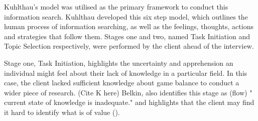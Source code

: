 Kuhlthau's model was utilised as the primary framework to conduct this information search. Kuhlthau developed this six step model, which outlines the human process of information searching, as well as the feelings, thoughts, actions and strategies that follow them. Stages one and two, named Task Initiation and Topic Selection respectively, were performed by the client ahead of the interview.

Stage one, Task Initiation, highlights the uncertainty and apprehension an individual might feel about their lack of knowledge in a particular field. In this case, the client lacked sufficient knowledge about game balance to conduct a wider piece of research.  (Cite K here) Belkin, also identifies this stage as (flow) " current state of knowledge is inadequate." and highlights that the client may find it hard to identify what is of value (\cite{belkin2000helping}).
